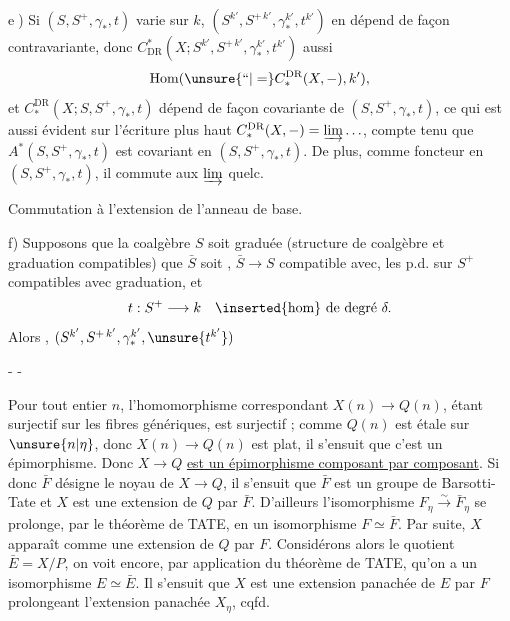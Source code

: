 
\textcircled{e)} Si $(S,S^+,\gamma_*,t)$ varie sur $k$, $(S^{k'},S^{+\,k'},\gamma_*^{k'},t^{k'})$ en dépend de façon contravariante, donc $C^*_{\mathrm{DR}}(X;S^{k'},S^{+\,k'},\gamma_*^{k'},t^{k'})$ aussi
\[
 \operatorname{Hom}(\unsure{\text{``}|=}C_*^{\mathrm{DR}}(X,-),k'),
\]
et $C_*^{\mathrm{DR}}(X;S,S^+,\gamma_*,t)$ dépend de façon covariante de $(S,S^+,\gamma_*,t)$, ce qui est aussi évident sur l'écriture plus haut $C_*^{\mathrm{DR}}(X,-)=\varinjlim\ldots$, compte tenu que $A^*(S,S^+,\gamma_*,t)$ est covariant en $(S,S^+,\gamma_*,t)$. De plus,  comme foncteur en $(S,S^+,\gamma_*,t)$, il commute aux $\varinjlim$ quelc.

Commutation à l'extension de l'anneau de base.

f) Supposons que la coalgèbre $S$ soit graduée (structure de coalgèbre et graduation compatibles) que $\bar S$ soit , $\bar S\longrightarrow S$ compatible avec, les p.d. sur $S^+$ compatibles avec graduation, et
\[
 t:S^+\longrightarrow k\quad\inserted{\text{hom}}\ \text{de degré }\delta.
\]
Alors  , $(S^{k'},S^{+\,k'},\gamma_*^{k'},\unsure{t^{k'}})$

\begin{center}-  -\end{center}

Pour tout entier $n$, l'homomorphisme correspondant $X(n)\longrightarrow Q(n)$, étant surjectif sur les fibres génériques, est surjectif ; comme $Q(n)$ est étale sur $\unsure{n|\eta}$, donc $X(n)\longrightarrow Q(n)$ est plat, il s'ensuit que c'est un épimorphisme. Donc $X\longrightarrow Q$ \uline{est un épimorphisme composant par composant}. Si donc $\bar F$ désigne le noyau de $X\longrightarrow Q$, il s'ensuit que $\bar F$ est un groupe de Barsotti-Tate et $X$ est une extension de $Q$ par $\bar F$. D'ailleurs l'isomorphisme $F_\eta\overset\sim\longrightarrow\bar F_\eta$ se prolonge, par le théorème de TATE, en un isomorphisme $F\simeq\bar F$. Par suite, $X$ apparaît comme une extension de $Q$ par $F$. Considérons alors le quotient $\bar E=X/P$, on voit encore, par application du théorème de TATE, qu'on a un isomorphisme $E\simeq\bar E$. Il s'ensuit que $X$ est une extension panachée de $E$ par $F$ prolongeant l'extension panachée $X_\eta$, cqfd.

